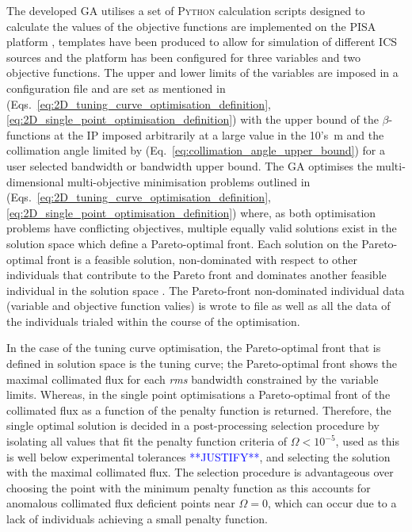 \documentclass[../main.tex]{subfiles}
\begin{document}
The developed GA utilises a set of \textsc{Python} calculation scripts designed to calculate the values of the objective functions are implemented on the \textsc{PISA} platform \cite{bleuler2003pisa},  templates have been produced to allow for simulation of different ICS sources and the platform has been configured for three variables and two objective functions. The upper and lower limits of the variables are imposed in a configuration file and are set as mentioned in (Eqs.~\ref{eq:2D_tuning_curve_optimisation_definition}, \ref{eq:2D_single_point_optimisation_definition}) with the upper bound of the $\beta$-functions at the IP imposed arbitrarily at a large value in the 10's~\si{\meter} and the collimation angle limited by (Eq.~\ref{eq:collimation_angle_upper_bound}) for a user selected bandwidth or bandwidth upper bound. The GA optimises the multi-dimensional multi-objective minimisation problems outlined in (Eqs.~\ref{eq:2D_tuning_curve_optimisation_definition},\ref{eq:2D_single_point_optimisation_definition}) where, as both optimisation problems have conflicting objectives, multiple equally valid solutions exist in the solution space which define a Pareto-optimal front. Each solution on the Pareto-optimal front is a feasible solution, non-dominated with respect to other individuals that contribute to the Pareto front and dominates another feasible individual in the solution space \cite{hofler2013innovative}. The Pareto-front non-dominated individual data (variable and objective function valies) is wrote to file as well as all the data of the individuals trialed within the course of the optimisation.  

In the case of the tuning curve optimisation, the Pareto-optimal front that is defined in solution space is the tuning curve; the Pareto-optimal front shows the maximal collimated flux for each \textit{rms} bandwidth constrained by the variable limits. Whereas, in the single point optimisations a Pareto-optimal front of the collimated flux as a function of the penalty function is returned. Therefore, the single optimal solution is decided in a post-processing selection procedure by isolating all values that fit the penalty function criteria of $\Omega < 10^{-5}$, used as this is well below experimental tolerances \textcolor{blue}{**JUSTIFY**}, and selecting the solution with the maximal collimated flux. The selection procedure is advantageous over choosing the point with the minimum penalty function as this accounts for anomalous collimated flux deficient points near $\Omega = 0$, which can occur due to a lack of individuals achieving a small penalty function.          
\end{document}
